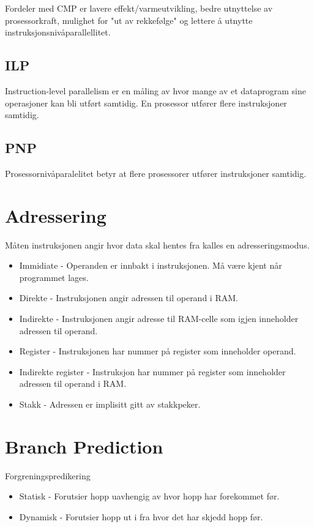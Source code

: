\documentclass[a4paper, 10pt]{article}
\begin{document}
Fordeler med CMP er lavere effekt/varmeutvikling, bedre utnyttelse av prosessorkraft, mulighet for "ut av rekkefølge" og lettere å utnytte instruksjonsnivåparallellitet.

\subsection{ILP}
Instruction-level parallelism er en måling av hvor mange av et dataprogram sine operasjoner kan bli utført samtidig.
En prosessor utfører flere instruksjoner samtidig. 

\subsection{PNP}
Prosessornivåparalelitet betyr at flere prosessorer utfører instruksjoner samtidig.


\section{Adressering}
Måten instruksjonen angir hvor data skal hentes fra kalles en adresseringsmodus.

\begin{itemize}
	\item Immidiate - Operanden er innbakt i instruksjonen. Må være kjent når programmet lages.
	\item Direkte - Instruksjonen angir adressen til operand i RAM.
	\item Indirekte - Instruksjonen angir adresse til RAM-celle som igjen inneholder adressen til operand.
	\item Register - Instruksjonen har nummer på register som inneholder operand.
	\item Indirekte register - Instruksjon har nummer på register som inneholder adressen til operand i RAM.
	\item Stakk - Adressen er implisitt gitt av stakkpeker.
\end{itemize}


\section{Branch Prediction}
Forgreningspredikering

\begin{itemize}
	\item Statisk - Forutsier hopp uavhengig av hvor hopp har forekommet før.
	\item Dynamisk - Forutsier hopp ut i fra hvor det har skjedd hopp før.
\end{itemize}
\end{document}
